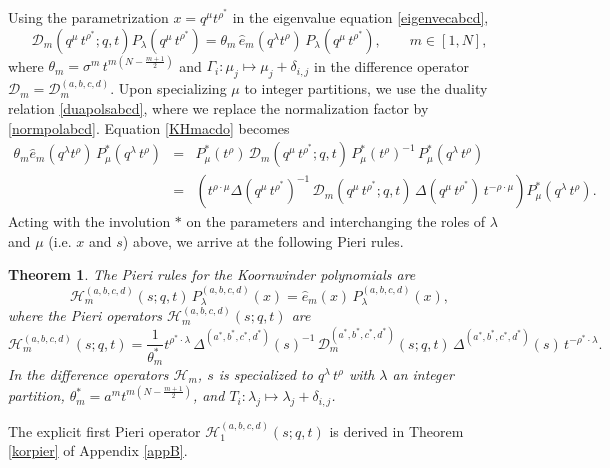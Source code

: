\documentclass[12pt]{amsart}
\newtheorem{thm}{Theorem}[section]
\newcommand{\D}{{\mathcal{D}}}
\newcommand{\cH}{{\mathcal{H}}}
\numberwithin{equation}{section}
\begin{document}
Using the parametrization  $x=q^\mu t^{\rho^*}$ in the eigenvalue equation \eqref{eigenvecabcd},
\begin{equation}\label{KHmacdo}
{\mathcal D}_m(q^\mu\,t^{\rho^*};q,t) P_\lambda(q^\mu\,t^{\rho^*})=\theta_m\, {\hat e}_m(q^\lambda t^\rho) \, P_\lambda(q^\mu\,t^{\rho^*}), \qquad m\in[1,N],
\end{equation}
where $\theta_m=\sigma^m \,t^{m(N-\frac{m+1}{2})}$ and $\Gamma_i: \mu_j \mapsto \mu_j+\delta_{i,j}$ in the difference  operator $\D_m=\D_m^{(a,b,c,d)}$. Upon specializing  $\mu$ to integer partitions, we  use
%
%
the duality relation \eqref{duapolsabcd}, where we replace the normalization factor by \eqref{normpolabcd}. Equation \eqref{KHmacdo} becomes
\begin{eqnarray*}
\theta_m{\hat e}_m(q^\lambda t^\rho)\, P_\mu^*(q^\lambda\,t^{\rho})
&=& P_\mu^*(t^{\rho})\, {\mathcal D}_m(q^\mu\,t^{\rho^*};q,t)\,P_\mu^*(t^{\rho})^{-1}\, P_\mu^*(q^\lambda\,t^{\rho})\\
&=&\left( t^{\rho\cdot\mu} \Delta(q^\mu\,t^{\rho^*})^{-1}\, {\mathcal D}_m(q^\mu\,t^{\rho^*};q,t)\, \Delta(q^\mu\,t^{\rho^*})\, t^{-\rho\cdot\mu}\right)P_\mu^*(q^\lambda\,t^{\rho}).
\end{eqnarray*}
Acting with the involution $*$ on the parameters and 
%
interchanging the roles of $\lambda$ and $\mu$ (i.e. $x$ and $s$) above, we arrive at the following Pieri rules.
\begin{thm}\label{kortopieri}
The Pieri rules for the Koornwinder polynomials are
\begin{equation}
\cH_m^{(a,b,c,d)}(s;q,t) \, P_\lambda^{(a,b,c,d)}(x)= {\hat e}_m(x)\, P_\lambda^{(a,b,c,d)}(x),\label{PieriK}\end{equation}
where the  Pieri operators $\cH_m^{(a,b,c,d)}(s;q,t)$ are 
%
\begin{equation}
\cH_m^{(a,b,c,d)}(s;q,t)=
\frac{1}{\theta_m^*}  t^{\rho^*\cdot\lambda}\,
\Delta^{(a^*,b^*,c^*,d^*)}(s)^{-1}\, {\mathcal D}_m^{(a^*,b^*,c^*,d^*)}(s;q,t)\,\Delta^{(a^*,b^*,c^*,d^*)}(s)\,t^{-\rho^*\cdot\lambda}.\label{PieriOpK}
\end{equation}
In the difference operators $\mathcal H_m$, $s$ is specialized to $q^\lambda\,t^{\rho}$ with $\lambda$ an integer partition, $\theta_m^*=a^{m} t^{m(N-\frac{m+1}{2})}$, and $T_i: \lambda_j\mapsto \lambda_j+\delta_{i,j}$.
%
\end{thm}
\noindent The explicit first Pieri operator $\cH_1^{(a,b,c,d)}(s;q,t)$ is derived  in Theorem \ref{korpier} of Appendix \ref{appB}.
\end{document}
